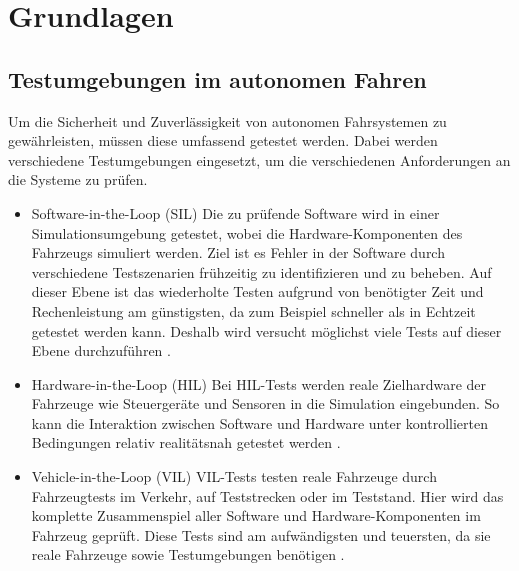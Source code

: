 \chapter{Grundlagen}

\section{Testumgebungen im autonomen Fahren}
Um die Sicherheit und Zuverlässigkeit von autonomen Fahrsystemen zu gewährleisten, müssen diese umfassend getestet werden. 
Dabei werden verschiedene Testumgebungen eingesetzt, um die verschiedenen Anforderungen an die Systeme zu prüfen. 

\begin{itemize}
    \item Software-in-the-Loop (SIL) \newline
            Die zu prüfende Software wird in einer Simulationsumgebung getestet, wobei die Hardware-Komponenten des Fahrzeugs simuliert werden. 
            Ziel ist es Fehler in der Software durch verschiedene Testszenarien frühzeitig zu identifizieren und zu beheben.
            Auf dieser Ebene ist das wiederholte Testen aufgrund von benötigter Zeit und Rechenleistung am günstigsten, da zum Beispiel schneller als in Echtzeit getestet werden kann. 
            Deshalb wird versucht möglichst viele Tests auf dieser Ebene durchzuführen \cite{EinfuehrungIntegrationsprojekt}.
    \item Hardware-in-the-Loop (HIL) \newline
            Bei HIL-Tests werden reale Zielhardware der Fahrzeuge wie Steuergeräte und Sensoren in die Simulation eingebunden. 
            So kann die Interaktion zwischen Software und Hardware unter kontrollierten Bedingungen relativ realitätsnah getestet werden \cite{EinfuehrungIntegrationsprojekt}.
    \item Vehicle-in-the-Loop (VIL) \newline
            VIL-Tests testen reale Fahrzeuge durch Fahrzeugtests im Verkehr, auf Teststrecken oder im Teststand. 
            Hier wird das komplette Zusammenspiel aller Software und Hardware-Komponenten im Fahrzeug geprüft.
            Diese Tests sind am aufwändigsten und teuersten, da sie reale Fahrzeuge sowie Testumgebungen benötigen \cite{EinfuehrungIntegrationsprojekt}.
\end{itemize}
